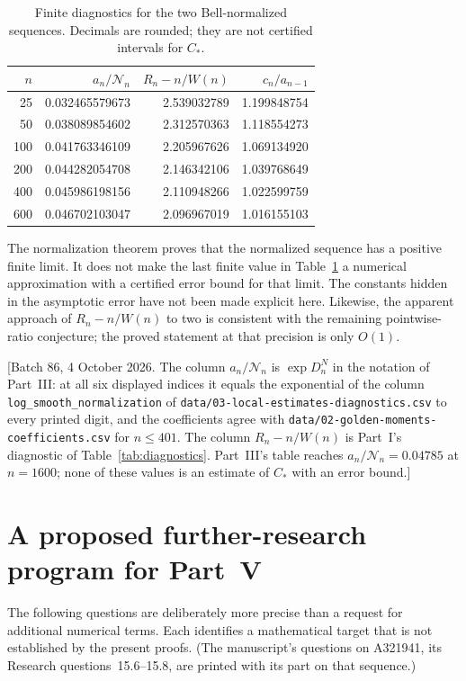 \documentclass[11pt]{article}
\numberwithin{equation}{section}
\theoremstyle{definition}
\theoremstyle{remark}
\begin{document}
\begin{table}[htbp]
\centering
\caption{Finite diagnostics for the two Bell-normalized sequences.
Decimals are rounded; they are not certified intervals for \(C_*\).}
\label{bnc:tab:bellnumeric}
\begin{tabular}{rrrr}
\toprule
\(n\)&\(a_n/\mathcal N_n\)&\(R_n-n/W(n)\)&\(c_n/a_{n-1}\)\\
\midrule
25 &0.032465579673&2.539032789&1.199848754\\
50 &0.038089854602&2.312570363&1.118554273\\
100&0.041763346109&2.205967626&1.069134920\\
200&0.044282054708&2.146342106&1.039768649\\
400&0.045986198156&2.110948266&1.022599759\\
600&0.046702103047&2.096967019&1.016155103\\
\bottomrule
\end{tabular}
\end{table}

The normalization theorem proves that the normalized sequence has a
positive finite limit.  It does not make the last finite value
in Table~\ref{bnc:tab:bellnumeric} a numerical approximation with a
certified error bound for that limit.  The constants hidden in
the asymptotic error have not been made explicit here.
Likewise, the apparent approach of \(R_n-n/W(n)\) to two is
consistent with the remaining pointwise-ratio conjecture; the
proved statement at that precision is only \(O(1)\).

[Batch 86, 4 October 2026. The column \(a_n/\mathcal N_n\) is
\(\exp D_n^N\) in the notation of Part~III: at all six displayed indices
it equals the exponential of the column
\texttt{log\_smooth\_normalization} of
\nolinkurl{data/03-local-estimates-diagnostics.csv} to every printed
digit, and the coefficients agree with
\nolinkurl{data/02-golden-moments-coefficients.csv} for \(n\le401\).
The column \(R_n-n/W(n)\) is Part~I's diagnostic of
Table~\ref{tab:diagnostics}. Part~III's table reaches
\(a_n/\mathcal N_n=0.04785\) at \(n=1600\); none of these values is an
estimate of \(C_*\) with an error bound.]

\section{A proposed further-research program for Part~V}\label{bnc:sec:future}

The following questions are deliberately more precise than a request
for additional numerical terms.  Each identifies a mathematical
target that is not established by the present proofs. (The manuscript's
questions on A321941, its Research questions~15.6--15.8, are printed
with its part on that sequence.)
\end{document}
